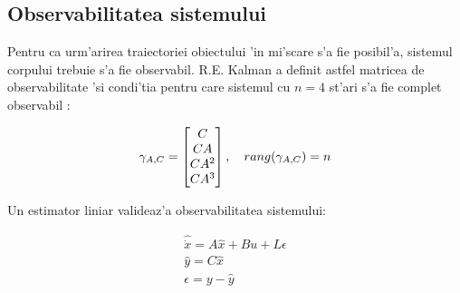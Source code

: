 \documentclass[12pt,a4paper,twoside]{report}
\begin{document}

\subsection{Observabilitatea sistemului}

Pentru ca urm'arirea traiectoriei obiectului 'in mi'scare s'a fie posibil'a, sistemul corpului trebuie s'a fie observabil. R.E. Kalman a definit astfel matricea de observabilitate 'si condi'tia pentru care sistemul cu $n = 4$ st'ari s'a fie complet observabil \cite{obs}:

\begin{equation}
    \gamma_{A,C} = \begin{bmatrix}
    C \\
    CA \\
    CA^2 \\
    CA^3 \\
    \end{bmatrix},
     \hspace{10px} rang (\gamma_{A,C}) = n
\end{equation}



Un estimator liniar \cite{obsdesign} valideaz'a observabilitatea sistemului: 

\begin{gather}
    \hat{\dot x} = A \hat x + Bu + L \epsilon \\
    \hat y = C \hat x \\
    \epsilon = y - \hat y
\end{gather}
\end{document}
